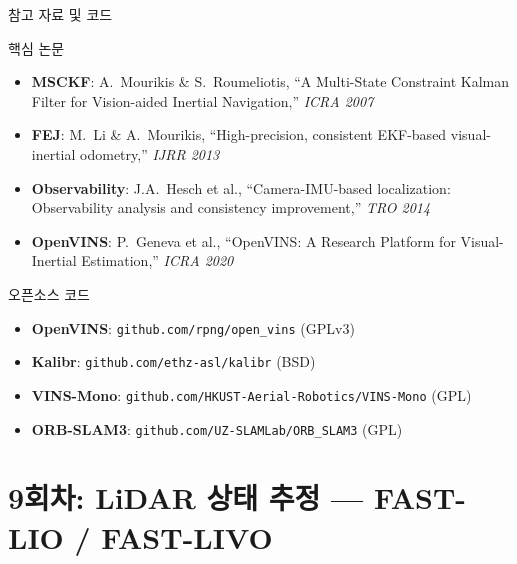 \begin{frame}[shrink=10]{참고 자료 및 코드}
  \begin{block}{핵심 논문}
    \begin{itemize}
      \item \textbf{MSCKF}: A.\ Mourikis \& S.\ Roumeliotis,
        ``A Multi-State Constraint Kalman Filter for Vision-aided Inertial Navigation,''
        \textit{ICRA 2007}
      \item \textbf{FEJ}: M.\ Li \& A.\ Mourikis,
        ``High-precision, consistent EKF-based visual-inertial odometry,''
        \textit{IJRR 2013}
      \item \textbf{Observability}: J.A.\ Hesch et al.,
        ``Camera-IMU-based localization: Observability analysis and consistency improvement,''
        \textit{TRO 2014}
      \item \textbf{OpenVINS}: P.\ Geneva et al.,
        ``OpenVINS: A Research Platform for Visual-Inertial Estimation,''
        \textit{ICRA 2020}
    \end{itemize}
  \end{block}
  \begin{block}{오픈소스 코드}
    \begin{itemize}
      \item \textbf{OpenVINS}: \texttt{github.com/rpng/open\_vins} (GPLv3)
      \item \textbf{Kalibr}: \texttt{github.com/ethz-asl/kalibr} (BSD)
      \item \textbf{VINS-Mono}: \texttt{github.com/HKUST-Aerial-Robotics/VINS-Mono} (GPL)
      \item \textbf{ORB-SLAM3}: \texttt{github.com/UZ-SLAMLab/ORB\_SLAM3} (GPL)
    \end{itemize}
  \end{block}
\end{frame}


\section{9회차: LiDAR 상태 추정 — FAST-LIO / FAST-LIVO}


